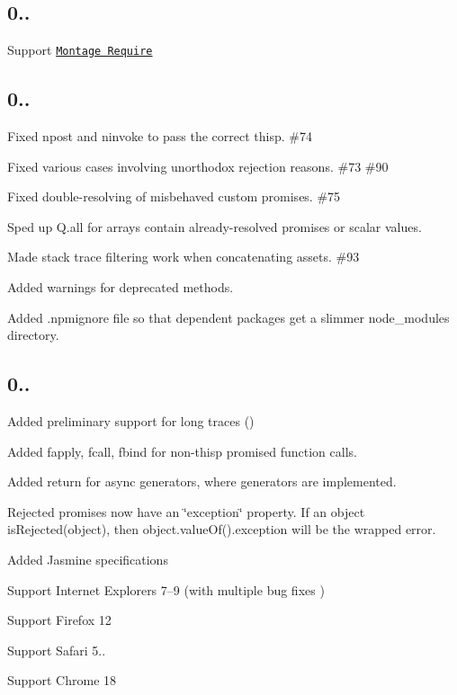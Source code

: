 \subsection*{0..}


\begin{DoxyItemize}
\item Support \href{http://github.com/kriskowal/mr}{\tt Montage Require}
\end{DoxyItemize}

\subsection*{0..}


\begin{DoxyItemize}
\item Fixed {\ttfamily npost} and {\ttfamily ninvoke} to pass the correct {\ttfamily thisp}. \#74
\item Fixed various cases involving unorthodox rejection reasons. \#73 \#90 
\item Fixed double-\/resolving of misbehaved custom promises. \#75
\item Sped up {\ttfamily Q.\+all} for arrays contain already-\/resolved promises or scalar values. 
\item Made stack trace filtering work when concatenating assets. \#93 
\item Added warnings for deprecated methods. 
\item Added {\ttfamily .npmignore} file so that dependent packages get a slimmer {\ttfamily node\+\_\+modules} directory.
\end{DoxyItemize}

\subsection*{0..}


\begin{DoxyItemize}
\item Added preliminary support for long traces ()
\item Added {\ttfamily fapply}, {\ttfamily fcall}, {\ttfamily fbind} for non-\/thisp promised function calls.
\item Added {\ttfamily return} for async generators, where generators are implemented.
\item Rejected promises now have an \char`\"{}exception\char`\"{} property. If an object is\+Rejected(object), then object.\+value\+Of().exception will be the wrapped error.
\item Added Jasmine specifications
\item Support Internet Explorers 7–9 (with multiple bug fixes )
\item Support Firefox 12
\item Support Safari 5..
\item Support Chrome 18
\end{DoxyItemize}

